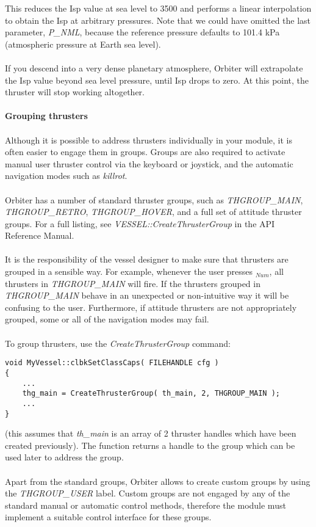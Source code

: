 \documentclass[Orbiter Developer Manual.tex]{subfiles}
\begin{document}
\noindent
This reduces the Isp value at sea level to 3500 and performs a linear interpolation to obtain the Isp at arbitrary pressures. Note that we could have omitted the last parameter, \textit{P\_NML}, because the reference pressure defaults to 101.4 kPa (atmospheric pressure at Earth sea level).\\
\\
If you descend into a very dense planetary atmosphere, Orbiter will extrapolate the Isp value beyond sea level pressure, until Isp drops to zero. At this point, the thruster will stop working altogether.\\
\\
\textbf{Grouping thrusters}\\
\\
Although it is possible to address thrusters individually in your module, it is often easier to engage them in groups. Groups are also required to activate manual user thruster control via the keyboard or joystick, and the automatic navigation modes such as \textit{killrot}.\\
\\
Orbiter has a number of standard thruster groups, such as \textit{THGROUP\_MAIN}, \textit{THGROUP\_RETRO}, \textit{THGROUP\_HOVER}, and a full set of attitude thruster groups. For a full listing, see \textit{VESSEL::\-Create\-Thruster\-Group} in the API Reference Manual.\\
\\
It is the responsibility of the vessel designer to make sure that thrusters are grouped in a sensible way. For example, whenever the user presses \keystroke{+}$_{Num}$, all thrusters in \textit{THGROUP\_MAIN} will fire. If the thrusters grouped in \textit{THGROUP\_MAIN} behave in an unexpected or non-intuitive way it will be confusing to the user. Furthermore, if attitude thrusters are not appropriately grouped, some or all of the navigation modes may fail.\\
\\
To group thrusters, use the \textit{CreateThrusterGroup} command:

\begin{lstlisting}
void MyVessel::clbkSetClassCaps( FILEHANDLE cfg )
{
	...
	thg_main = CreateThrusterGroup( th_main, 2, THGROUP_MAIN );
	...
}
\end{lstlisting}

\noindent
(this assumes that \textit{th\_main} is an array of 2 thruster handles which have been created previously). The function returns a handle to the group which can be used later to address the group.\\
\\
Apart from the standard groups, Orbiter allows to create custom groups by using the \textit{THGROUP\_USER} label. Custom groups are not engaged by any of the standard manual or automatic control methods, therefore the module must implement a suitable control interface for these groups.
\end{document}
